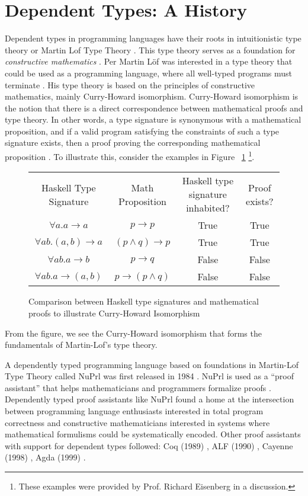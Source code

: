 \section{Dependent Types: A History}
Dependent types in programming languages have their roots in intuitionistic type
theory or Martin Lof Type Theory \cite{intro_martin_lof, ml_type_theory}. This
type theory serves as a foundation for \textit{constructive mathematics}
\cite{constructive_math}. Per Martin Löf was interested in a type theory that
could be used as a programming language, where all well-typed programs must
terminate \cite{ml_type_theory}. His type theory is based on the principles of
constructive mathematics, mainly Curry-Howard isomorphism. Curry-Howard
isomorphism is the notion that there is a direct correspondence between
mathematical proofs and type theory. In other words, a type signature is
synonymous with a mathematical proposition, and if a valid program satisfying
the constraints of such a type signature exists, then a proof proving the
corresponding mathematical proposition \cite{martin_lof, ml_type_theory}. To
illustrate this, consider the examples in Figure ~\ref{ml_type_theory_examples}
\footnote{These examples were provided by Prof. Richard Eisenberg in a
discussion.}. 

\begin{figure}
    \label{ml_type_theory_examples}
    \caption{Comparison between Haskell type signatures and mathematical proofs to illustrate Curry-Howard Isomorphism}
    \begin{tabular}{c|c|c|c}
        Haskell Type Signature & Math Proposition & Haskell type signature inhabited? & Proof exists? \\
        $\forall a. a \rightarrow a$ & $p \rightarrow p$ & True & True \\
        $\forall ab. (a,b) \rightarrow a$ & $ (p \wedge q) \rightarrow p$ & True & True \\
        $\forall ab. a \rightarrow b$ & $p\rightarrow q$ & False & False \\
        $\forall ab. a \rightarrow (a,b)$ & $p \rightarrow (p\wedge q)$ & False & False 
    \end{tabular}
\end{figure}

From the figure, we see the Curry-Howard isomorphism that forms the fundamentals of Martin-Lof's type theory. 

A dependently typed programming language based on foundations in Martin-Lof Type
Theory called NuPrl was first released in 1984 \cite{nuprl}. NuPrl is used as a
``proof assistant'' that helps mathematicians and programmers formalize proofs
\cite{prl_home}. Dependently typed proof assistants like NuPrl found a home at
the intersection between programming language enthusiasts interested in total
program correctness and constructive mathematicians interested in systems where
mathematical formulisms could be systematically encoded. Other proof assistants
with support for dependent types followed: Coq (1989) \cite{girard1989proofs},
ALF (1990) \cite{Magnusson95theimplementation}, Cayenne (1998)
\cite{Augustsson:1998:CLD:291251.289451}, Agda (1999)
\cite{structured_type_theory}.

